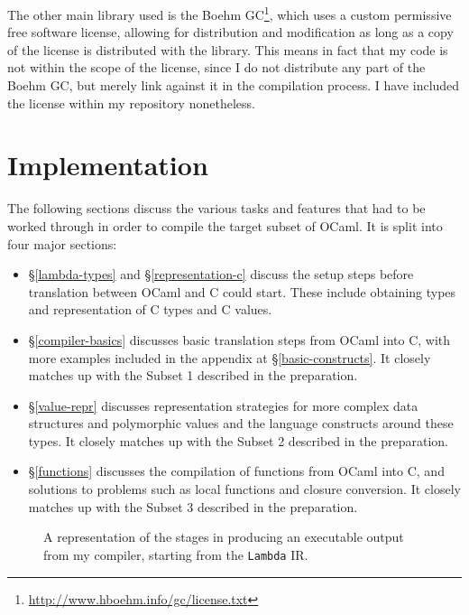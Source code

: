 The other main library used is the Boehm
GC\footnote{\url{http://www.hboehm.info/gc/license.txt}}, which uses a custom
permissive free software license, allowing for distribution and modification as
long as a copy of the license is distributed with the library. This means in
fact that my code is not within the scope of the license, since I do not
distribute any part of the Boehm GC, but merely link against it in the
compilation process. I have included the license within my repository
nonetheless.

\chapter{Implementation}

The following sections discuss the various tasks and features that had to be
worked through in order to compile the target subset of OCaml. It is split into
four major sections:

\begin{itemize}

\item \S\ref{lambda-types} and \S\ref{representation-c} discuss the setup steps
    before translation between OCaml and C could start. These include obtaining
    types and representation of C types and C values.

\item \S\ref{compiler-basics} discusses basic translation steps from OCaml into
    C, with more examples included in the appendix at \S\ref{basic-constructs}.
    It closely matches up with the Subset 1 described in the preparation.

\item \S\ref{value-repr} discusses representation strategies for more complex
    data structures and polymorphic values and the language constructs around
    these types. It closely matches up with the Subset 2 described in the
    preparation.

\item \S\ref{functions} discusses the compilation of functions from OCaml into
    C, and solutions to problems such as local functions and closure conversion.
    It closely matches up with the Subset 3 described in the preparation.

\end{itemize}

\begin{figure}
    \centering
    
    \caption{A representation of the stages in producing an executable output
    from my compiler, starting from the \texttt{Lambda} IR.}\label{fig:compilerpipeline}
\end{figure}

